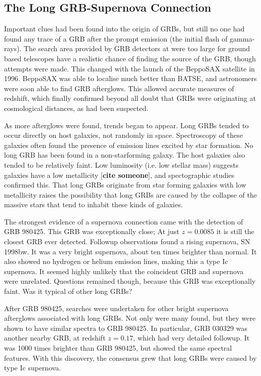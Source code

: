 \documentclass[11pt]{cuthesis}
\begin{document}
\subsection{The Long GRB-Supernova Connection}
Important clues had been found into the origin of GRBs, but still no one had found any trace of a GRB after the prompt emission (the initial flash of gamma-rays). The search area provided by GRB detectors at were too large for ground based telescopes have a realistic chance of finding the source of the GRB, though attempts were made. This changed with the launch of the BeppoSAX satellite in 1996. BeppoSAX was able to localise much better than BATSE, and astronomers were soon able to find GRB afterglows. This allowed accurate measures of redshift, which finally confirmed beyond all doubt that GRBs were originating at cosmological distances, as had been suspected.  

As more afterglows were found, trends began to appear. Long GRBs tended to occur directly on host galaxies, not randomly in space. Spectroscopy of these galaxies often found the presence of emission lines excited by star formation. No long GRB has been found in a non-starforming galaxy. The host galaxies also tended to be relatively faint. Low luminosity (i.e. low stellar mass) suggests galaxies have a low metallicity [\textbf{cite someone}], and spectographic studies confirmed this. That long GRBs originate from star forming galaxies with low metallicity raises the possibility that long GRBs are caused by the collapse of the massive stars that tend to inhabit these kinds of galaxies. 

The strongest evidence of a supernova connection came with the detection of GRB 980425. This GRB was exceptionally close; At just $z=0.0085$ it is still the closest GRB ever detected. Followup observations found a rising supernova, SN 1998bw. It was a very bright supernova, about ten times brighter than normal. It also showed no hydrogen or helium emission lines, making this a type Ic supernova. It seemed highly unlikely that the coincident GRB and supernova were unrelated. Questions remained though, because this GRB was exceptionally faint. Was it typical of other long GRBs? 

After GRB 980425, searches were undertaken for other bright supernova afterglows associated with long GRBs. Not only were many found, but they were shown to have similar spectra to GRB 980425. In particular, GRB 030329 was another nearby GRB, at redshift $z=0.17$, which had very detailed followup. It was 1000 times brighter than GRB 980425, but showed the same spectral features. With this discovery, the consensus grew that long GRBs were caused by type Ic supernova.
\end{document}
